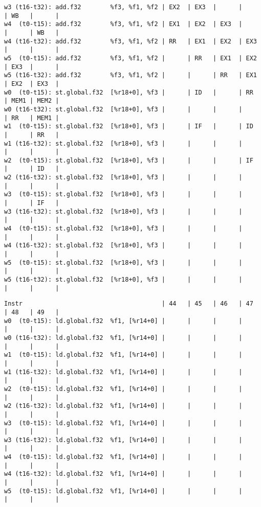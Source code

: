 \documentclass[11pt]{article}
\begin{document}
\begin{Answer}
\begin{verbatim}
w3 (t16-t32): add.f32        %f3, %f1, %f2 | EX2  | EX3  |      |      | WB   |      |
w4  (t0-t15): add.f32        %f3, %f1, %f2 | EX1  | EX2  | EX3  |      |      | WB   |
w4 (t16-t32): add.f32        %f3, %f1, %f2 | RR   | EX1  | EX2  | EX3  |      |      |
w5  (t0-t15): add.f32        %f3, %f1, %f2 |      | RR   | EX1  | EX2  | EX3  |      |
w5 (t16-t32): add.f32        %f3, %f1, %f2 |      |      | RR   | EX1  | EX2  | EX3  |
w0  (t0-t15): st.global.f32  [%r18+0], %f3 |      | ID   |      | RR   | MEM1 | MEM2 |
w0 (t16-t32): st.global.f32  [%r18+0], %f3 |      |      |      |      | RR   | MEM1 |
w1  (t0-t15): st.global.f32  [%r18+0], %f3 |      | IF   |      | ID   |      | RR   |
w1 (t16-t32): st.global.f32  [%r18+0], %f3 |      |      |      |      |      |      |
w2  (t0-t15): st.global.f32  [%r18+0], %f3 |      |      |      | IF   |      | ID   |
w2 (t16-t32): st.global.f32  [%r18+0], %f3 |      |      |      |      |      |      |
w3  (t0-t15): st.global.f32  [%r18+0], %f3 |      |      |      |      |      | IF   |
w3 (t16-t32): st.global.f32  [%r18+0], %f3 |      |      |      |      |      |      |
w4  (t0-t15): st.global.f32  [%r18+0], %f3 |      |      |      |      |      |      |
w4 (t16-t32): st.global.f32  [%r18+0], %f3 |      |      |      |      |      |      |
w5  (t0-t15): st.global.f32  [%r18+0], %f3 |      |      |      |      |      |      |
w5 (t16-t32): st.global.f32  [%r18+0], %f3 |      |      |      |      |      |      |
\end{verbatim}
\newpage
\begin{verbatim}
Instr                                      | 44   | 45   | 46   | 47   | 48   | 49   |
w0  (t0-t15): ld.global.f32  %f1, [%r14+0] |      |      |      |      |      |      |
w0 (t16-t32): ld.global.f32  %f1, [%r14+0] |      |      |      |      |      |      |
w1  (t0-t15): ld.global.f32  %f1, [%r14+0] |      |      |      |      |      |      |
w1 (t16-t32): ld.global.f32  %f1, [%r14+0] |      |      |      |      |      |      |
w2  (t0-t15): ld.global.f32  %f1, [%r14+0] |      |      |      |      |      |      |
w2 (t16-t32): ld.global.f32  %f1, [%r14+0] |      |      |      |      |      |      |
w3  (t0-t15): ld.global.f32  %f1, [%r14+0] |      |      |      |      |      |      |
w3 (t16-t32): ld.global.f32  %f1, [%r14+0] |      |      |      |      |      |      |
w4  (t0-t15): ld.global.f32  %f1, [%r14+0] |      |      |      |      |      |      |
w4 (t16-t32): ld.global.f32  %f1, [%r14+0] |      |      |      |      |      |      |
w5  (t0-t15): ld.global.f32  %f1, [%r14+0] |      |      |      |      |      |      |

\end{verbatim}
\end{Answer}
\end{document}
